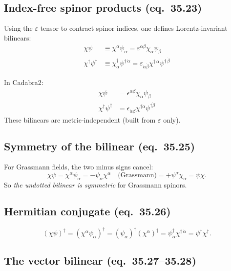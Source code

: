 \documentclass[12pt]{article}
\newcommand{\dal}{\dot\alpha}
\newcommand{\dbe}{\dot\beta}
\begin{document}
\subsection{Index-free spinor products (eq.~35.23)}

Using the $\varepsilon$ tensor to contract spinor indices, one defines
Lorentz-invariant bilinears:
\begin{align}
  \chi\psi &\equiv \chi^\alpha\psi_\alpha
  = \varepsilon^{\alpha\beta}\chi_\alpha\psi_\beta
  \tag{35.23a}\\
  \chi^\dagger\psi^\dagger
  &\equiv \chi^\dagger_{\dot\alpha}\psi^{\dagger\,\dot\alpha}
  = \varepsilon_{\dot\alpha\dot\beta}\chi^{\dagger\,\dot\alpha}\psi^{\dagger\,\dot\beta}
  \tag{35.23b}
\end{align}

In Cadabra2:
\begin{align*}
  \chi\psi &= \epsilon^{\alpha \beta} \chi_{\alpha} \psi_{\beta} \\
  \chi^\dagger\psi^\dagger &= \epsilon_{\dal \dbe} \chi^{\dagger\dal} \psi^{\dagger\dbe}
\end{align*}
These bilinears are metric-independent (built from $\varepsilon$ only).

\subsection{Symmetry of the bilinear (eq.~35.25)}

For Grassmann fields, the two minus signs cancel:
\begin{equation}
  \chi\psi = \chi^\alpha\psi_\alpha
  = -\psi_\alpha\chi^\alpha \quad\text{(Grassmann)}
  = +\psi^\alpha\chi_\alpha = \psi\chi.
  \tag{35.25}
\end{equation}
So \emph{the undotted bilinear is symmetric} for Grassmann spinors.

\subsection{Hermitian conjugate (eq.~35.26)}

\begin{equation}
  (\chi\psi)^\dagger = (\chi^\alpha\psi_\alpha)^\dagger
  = (\psi_\alpha)^\dagger(\chi^\alpha)^\dagger
  = \psi^\dagger_{\dot\alpha}\chi^{\dagger\,\dot\alpha}
  = \psi^\dagger\chi^\dagger.
  \tag{35.26}
\end{equation}

\subsection{The vector bilinear (eq.~35.27--35.28)}
\end{document}
